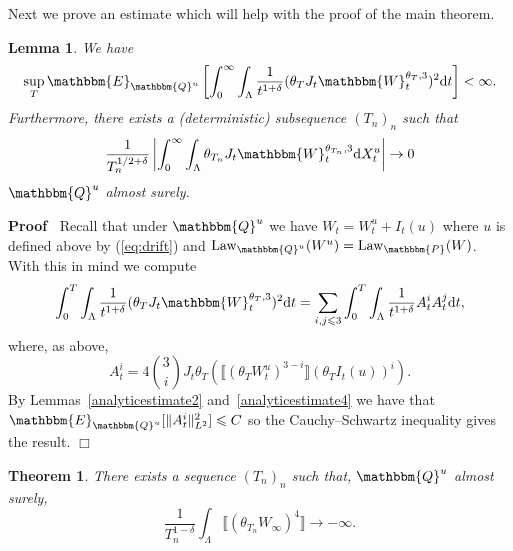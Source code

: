 \documentclass[11pt]{article}
\newcommand{\mathd}{\mathrm{d}}
\newcommand{\tmop}[1]{\ensuremath{\operatorname{#1}}}
\newenvironment{proof}{\noindent\textbf{Proof\ }}{\hspace*{\fill}$\Box$\medskip}
\newtheorem{lemma}{Lemma}
\newtheorem{theorem}{Theorem}
\begin{document}
Next we prove an estimate which will help with the proof of the main theorem.

\begin{lemma}
  \label{Qcubeestimate}We have
  \[ \sup_T \mathbbm{E}_{\mathbbm{Q}^u} \left[ \int^{\infty}_0 \int_{\Lambda}
     \frac{1}{t^{1 + \delta}} (\theta_T J_t \mathbbm{W}_t^{\theta_T, 3})^2
     \mathd t \right] < \infty . \]
  Furthermore, there exists a (deterministic) subsequence $(T_n)_n$ such that
  \
  \[ \frac{1}{T_n^{1 / 2 + \delta}} \left| \int^{\infty}_0 \int_{\Lambda}
     \theta_{T_n} J_t \mathbbm{W}_t^{\theta_{T_n}, 3} \mathd X^u_t \right|
     \rightarrow 0 \]
  $\mathbbm{Q}^u$ almost surely.
\end{lemma}

\begin{proof}
  Recall that under $\mathbbm{Q}^u$ we have $W_t = W_t^u + I_t (u)$ where $u$
  is defined above by (\ref{eq:drift}) and $\tmop{Law}_{\mathbbm{Q}^u} (W^u) =
  \tmop{Law}_{\mathbbm{P}} (W)$. With this in mind we compute
  \[ \int^T_0 \int_{\Lambda} \frac{1}{t^{1 + \delta}} (\theta_T J_t
     \mathbbm{W}_t^{\theta_T, 3})^2 \mathd t = \sum_{i, j \leqslant 3}
     \int^T_0 \int_{\Lambda} \frac{1}{t^{1 + \delta}} A_t^i A_t^j \mathd t, \]
  where, as above,
  \[ A_t^i = 4 \binom{3}{i} J_t \theta_T (\llbracket (\theta_T W^u_t)^{3 - i}
     \rrbracket (\theta_T I_t (u))^i) . \]
  By Lemmas~\ref{analyticestimate2} and~\ref{analyticestimate4} we have that
  $\mathbbm{E}_{\mathbbm{Q}^u} [\| A_t^i \|^2_{L^2}] \leqslant C$ so the
  Cauchy--Schwartz inequality gives the result.
\end{proof}

\begin{theorem}
  There exists a sequence $(T_n)_n$ such that, $\mathbbm{Q}^u$ almost surely,
  \[ \frac{1}{T^{1 - \delta}_n} \int_{\Lambda} \llbracket (\theta_{T_n}
     W_{\infty})^4 \rrbracket \rightarrow - \infty . \]
\end{theorem}
\end{document}
